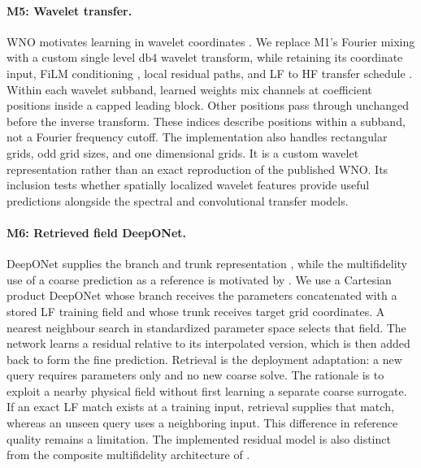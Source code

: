 \paragraph{M5: Wavelet transfer.}
WNO motivates learning in wavelet coordinates \citep{tripura2022wno}. We
replace M1's Fourier mixing with a custom single level db4 wavelet transform,
while retaining its coordinate input, FiLM conditioning \citep{perez2018},
local residual paths, and LF to HF transfer schedule \citep{lyu2023}. Within
each wavelet subband, learned weights mix channels at coefficient positions
inside a capped leading block. Other positions pass through unchanged before
the inverse transform. These indices describe positions within a subband,
not a Fourier frequency cutoff. The implementation also handles rectangular
grids, odd grid sizes, and one dimensional grids. It is a custom wavelet
representation rather than an exact reproduction of the published WNO.
Its inclusion tests whether spatially localized wavelet features provide useful
predictions alongside the spectral and convolutional transfer models.

\paragraph{M6: Retrieved field DeepONet.}
DeepONet supplies the branch and trunk representation \citep{lu2021}, while
the multifidelity use of a coarse prediction as a reference is motivated by
\citet{lu2022mf}. We use a Cartesian product DeepONet whose branch receives
the parameters concatenated with a stored LF training field and whose trunk
receives target grid coordinates. A nearest neighbour search in standardized
parameter space selects that field. The network learns a residual relative to
its interpolated version, which is then added back to form the fine prediction.
Retrieval is the deployment adaptation: a new query requires parameters only
and no new coarse solve. The rationale is to exploit a nearby physical field
without first learning a separate coarse surrogate. If an exact LF match exists
at a training input, retrieval supplies that match, whereas an unseen query
uses a neighboring input. This difference in reference quality remains a
limitation. The implemented residual model is also distinct from the composite
multifidelity architecture of \citet{howard2023}.


